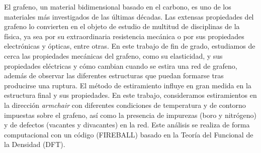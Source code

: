 El grafeno, un material bidimensional basado en el carbono, es uno de los materiales más investigados de las últimas décadas. Las extensas propiedades del grafeno lo convierten en el objeto de estudio de multitud de disciplinas de la física, ya sea por su extraordinaria resistencia mecánica o por sus propiedades electrónicas y ópticas, entre otras. En este trabajo de fin de grado, estudiamos de cerca las propiedades mecánicas del grafeno, como su elasticidad, y sus propiedades eléctricas y cómo cambian cuando se estira una red de grafeno, además de observar las diferentes estructuras que puedan formarse tras producirse una ruptura. El método de estiramiento influye en gran medida en la estructura final y sus propiedades. En este trabajo, consideramos estiramientos en la dirección \emph{armchair} con diferentes condiciones de temperatura y de contorno impuestas sobre el grafeno, así como la presencia de impurezas (boro y nitrógeno) y de defectos (vacantes y divacantes) en la red. Este análisis se realiza de forma computacional con un código (FIREBALL) basado en la Teoría del Funcional de la Densidad (DFT).